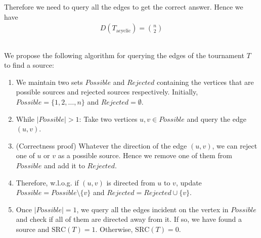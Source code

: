 \documentclass{article}
\begin{document}
Therefore we need to query all the edges to get the correct answer. Hence we have
\begin{align*}
	\boxed{D(T_\text{acyclic}) = {n \choose 2}}
\end{align*}
\vspace*{-12mm}\begin{flushright}\qedsymbol\end{flushright}


\pagebreak
\subsection{} \vspace*{-8mm}

We propose the following algorithm for querying the edges of the tournament $T$ to find a source:
\begin{enumerate}
	\item We maintain two sets $Possible$ and $Rejected$ containing the vertices that are possible sources and rejected sources respectively. Initially, $Possible = \{1, 2, \dots, n\}$ and $Rejected = \emptyset$.
	\item While $|Possible| > 1$: Take two vertices $u, v \in Possible$ and query the edge $(u, v)$.
	\item (Correctness proof) Whatever the direction of the edge $(u, v)$, we can reject one of $u$ or $v$ as a possible source. Hence we remove one of them from $Possible$ and add it to $Rejected$.
	\item Therefore, w.l.o.g. if $(u, v)$ is directed from $u$ to $v$, update $Possible = Possible \setminus \{v\}$ and $Rejected = Rejected \cup \{v\}$.
	\item Once $|Possible| = 1$, we query all the edges incident on the vertex in $Possible$ and check if all of them are directed away from it. If so, we have found a source and $\text{SRC}(T) = 1$. Otherwise, $\text{SRC}(T) = 0$.
\end{enumerate}
\end{document}

